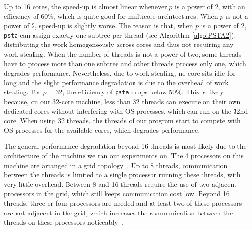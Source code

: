 Up to 16 cores, the speed-up is almost linear whenever $p$ is a power
of $2$, with an efficiency of 60\%, which is quite good for multicore
architectures.  When $p$ is not a power of $2$, speed-up is slightly
worse.  The reason is that, when $p$ is a power of $2$, {\tt psta} can
assign exactly one subtree per thread (see Algorithm
\ref{algo:PSTA2}), distributing the work homogeneously across cores
and thus not requiring any work stealing.  When the number of threads
is not a power of two, some threads have to process more than one
subtree and other threads process only one, which degrades
performance.  Nevertheless, due to work stealing, no core sits idle
for long and the slight performance degradation is due to the overhead
of work stealing.  For $p = 32$, the efficiency of {\tt psta} drops
below 50\%.  This is likely because, on our 32-core machine, less than
32 threads can execute on their own dedicated cores without
interfering with OS processes, which can run on the 32nd core.  When
using 32 threads, the threads of our program start to compete with OS
processes for the available cores, which degrades performance.

The general performance degradation beyond 16 threads is most likely
due to the architecture of the machine we ran our experiments on.  The
4 processors on this machine are arranged in a grid
topology~\cite{Drepper2007}.  Up to 8 threads, communication between
the threads is limited to a single processor running these threads,
with very little overhead.  Between 8 and 16 threads require the use
of two adjacent processors in the grid, which still keeps
communication cost low.  Beyond 16 threads, three or four processors
are needed and at least two of these processors are not adjacent in
the grid, which increases the communication between the threads on
these processors noticeably.  .

